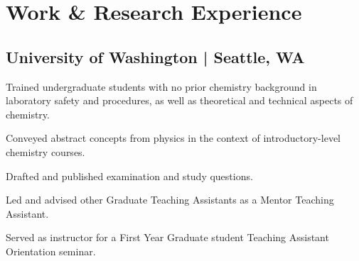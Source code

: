 \documentclass[letterpaper]{deedy-resume} %
\begin{document}
\begin{minipage}[t]{0.65\textwidth} %


\section{Work \& Research Experience}
\subsection{University of Washington | Seattle, WA}
\vspace{\topsep} %
\begin{tightitemize}
\item Trained undergraduate students with no prior chemistry background in laboratory safety and procedures, as well as theoretical and technical aspects of chemistry.
\item Conveyed abstract concepts from physics in the context of introductory-level chemistry courses.
\item Drafted and published examination and study questions.
\item Led and advised other Graduate Teaching Assistants as a Mentor Teaching Assistant.
\item Served as instructor for a First Year Graduate student Teaching Assistant Orientation seminar.
\end{tightitemize}
\sectionspace 


\end{minipage}
\end{document}
